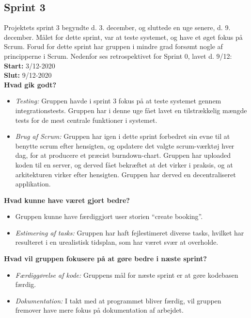 \subsection{Sprint 3}
Projektets sprint 3 begyndte d. 3. december, og sluttede en uge senere, d. 9. december.
Målet for dette sprint, var at teste systemet, og have et øget fokus på Scrum. Forud for dette sprint
har gruppen i mindre grad forsømt nogle af principperne i Scrum. 
Nedenfor ses retrospektivet for Sprint 0, lavet d. 9/12: \\

\textbf{Start:} 3/12-2020 \\
\textbf{Slut:} 9/12-2020 \\

\textbf{Hvad gik godt?}
\begin{itemize}
    \item \textit{Testing:} Gruppen havde i sprint 3 fokus på at teste systemet gennem integrationstests. Gruppen har i denne uge fået 
    lavet en tilstrækkelig mængde tests for de mest centrale funktioner i systemet.
    \item \textit{Brug af Scrum:} Gruppen har igen i dette sprint forbedret sin evne til at benytte scrum efter hensigten, og opdatere 
    det valgte scrum-værktøj hver dag, for at producere et præcist burndown-chart.
    Gruppen har uploaded koden til en server, og derved fået bekræftet at det virker i praksis, og at arkitekturen virker efter hensigten. 
    Gruppen har derved en decentraliseret applikation.
\end{itemize}

\textbf{Hvad kunne have været gjort bedre?}
\begin{itemize}
    \item Gruppen kunne have færdiggjort user storien “create booking”.
    \item \textit{Estimering af tasks:} Gruppen har haft fejlestimeret diverse tasks, hvilket har resulteret i en urealistisk tidsplan, som har været
    svær at overholde.
\end{itemize}

\textbf{Hvad vil gruppen fokusere på at gøre bedre i næste sprint?}
\begin{itemize}
    \item \textit{Færdiggørelse af kode:} Gruppens mål for næste sprint er at gøre kodebasen færdig.
    \item \textit{Dokumentation:} I takt med at programmet bliver færdig, vil gruppen fremover have mere fokus på dokumentation af arbejdet.
\end{itemize}